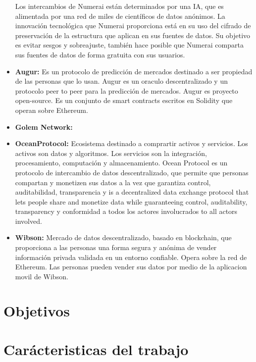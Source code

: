 \documentclass[
11pt, %
spanish, %
singlespacing, %
headsepline, %
]{MastersDoctoralThesis} %
\begin{document}
\begin{itemize}
Los intercambios de Numerai están determinados por una IA, que es alimentada por una red de miles de científicos de datos anónimos. La innovación tecnológica que Numerai proporciona está en su uso del cifrado de preservación de la estructura que aplican en sus fuentes de datos. Su objetivo es evitar sesgos y sobreajuste, también hace posible que Numerai comparta sus fuentes de datos de forma gratuita con sus usuarios.

\item \textbf{Augur:} Es un protocolo de predicción de mercados destinado a ser propiedad de las personas que lo usan.
Augur es un oraculo descentralizado y un protocolo peer to peer para la predicción de mercados. Augur es proyecto open-source. Es un conjunto de smart contracts escritos en Solidity que operan sobre Ethereum.



\item \textbf{Golem Network:}

\item \textbf{OceanProtocol:} Ecosistema destinado a comprartir activos y servicios. 
Los activos son datos y algoritmos. Los servicios son la integración, procesamiento, computación y almacenamiento. 
Ocean Protocol es un protocolo de intercambio de datos descentralizado, que permite que personas compartan y monetizen sus datos a la vez que garantiza control, auditabilidad, transparencia y is a decentralized data exchange protocol that lets people share and monetize data while guaranteeing control, auditability, transparency y conformidad a todos los actores involucrados to all actors involved.

\item \textbf{Wibson:} Mercado de datos descentralizado, basado en blockchain, que proporciona a las personas una forma segura y anónima de vender información privada validada en un entorno confiable. Opera sobre la red de Ethereum. Las personas pueden vender sus datos por medio de la aplicacion movil de Wibson.
\end{itemize}

\chapter{Objetivos}

\chapter{Car\'acteristicas del trabajo}
\end{document}
